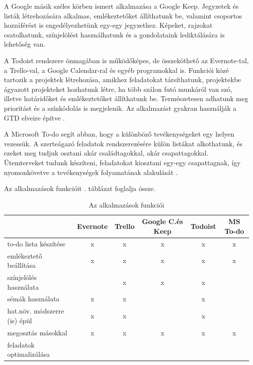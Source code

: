 A Google másik széles körben ismert alkalmazása a Google Keep. Jegyzetek és listák létrehozására alkalmas, emlékeztetőket állíthatunk be, valamint csoportos hozzáférést is engedélyezhetünk egy-egy jegyzethez. Képeket, rajzokat csatolhatunk, színjelölést használhatunk és a gondolataink lediktálására is lehetőség van.


A Todoist rendszere önmagában is működőképes, de összeköthető az Evernote-tal, a Trello-val, a Google Calendar-ral és egyéb programokkal is. Funkciói közé tartozik a projektek létrehozása, amikhez feladatokat társíthatunk, projektekbe ágyazott projekteket hozhatunk létre, ha több szálon futó munkáról van szó, illetve határidőket és emlékeztetőket állíthatunk be. Természetesen adhatunk meg prioritást és a színkódolás is megjelenik. Az alkalmazást gyakran használják a GTD elveire építve \cite{todoist}.


A Microsoft To-do segít abban, hogy a különböző tevékenységeket egy helyen vezessük. A szerteágazó feladatok rendszerezésére külön listákat alkothatunk, és ezeket meg tudjuk osztani akár családtagokkal, akár csapattagokkal. Ütemterveket tudunk készíteni, feladatokat kiosztani egy-egy csapattagnak, így nyomonkövetve a tevékenységek folyamatának alakulását \cite{todo}.


Az alkalmazások funkcióit . táblázat foglalja össze.

\begin{table}[h]
	\centering
	\caption{Az alkalmazások funkciói}
	\vskip 3mm
	\label{tab:minta}
	\tabcolsep=0.1cm
	\begin{tabular}{|l|c|c|c|c|c|}
		\hline
		 & Evernote & Trello & Google C.és Keep & Todoist & MS To-do \\
		\hline
		to-do lista készítése & x & x & x & x & x \\
		\hline
		emlékeztető beállítása &x & x & x & x & x \\
		\hline
		színjelölés használata &  & x & x & x &   \\
		\hline
		sémák használata & x & x &   & x &   \\
		\hline
		hat.növ. módszerre (is) épül & x & x &   & x &   \\
		\hline
		megosztás másokkal & x & x & x & x & x \\
		\hline
		feladatok optimalizálása &  &   &   &   &   \\
		\hline
	\end{tabular}
\end{table}

